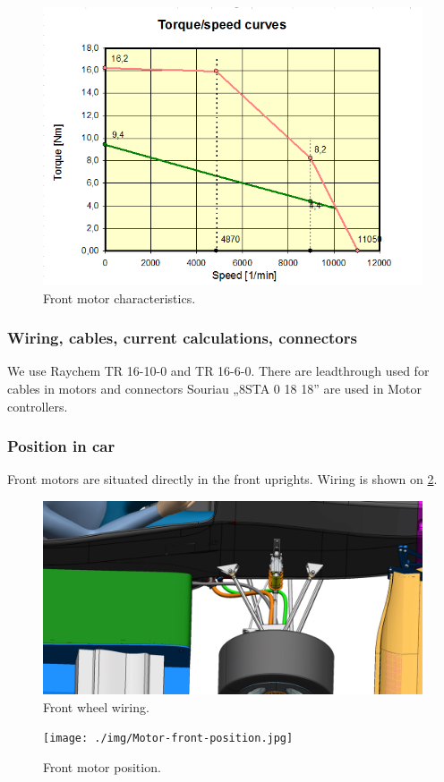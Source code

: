\begin{figure}[H]
	\centering
	\includegraphics[width=\textwidth]{./img/MOTOR2-torque.png}
	\caption{Front motor characteristics.}
	\label{fig:torque2}
\end{figure}


\subsubsection{Wiring, cables, current calculations, connectors}
We use Raychem TR 16-10-0 and TR 16-6-0. There are leadthrough used for cables in motors and connectors Souriau „8STA 0 18 18” are used in Motor controllers.

\subsubsection{Position in car}
Front motors are situated directly in the front uprights. Wiring is shown on \ref{fig:fhwiring}.

\begin{figure}[H]
	\centering
	\includegraphics[width=\textwidth]{./img/fw-wiring.jpg}
	\caption{Front wheel wiring.}
	\label{fig:fhwiring}
\end{figure}

\begin{figure}[H]
	\centering
	\texttt{[image: ./img/Motor-front-position.jpg]}
	\caption{Front motor position.}
	\label{fig:Motor-front-position}
\end{figure}


